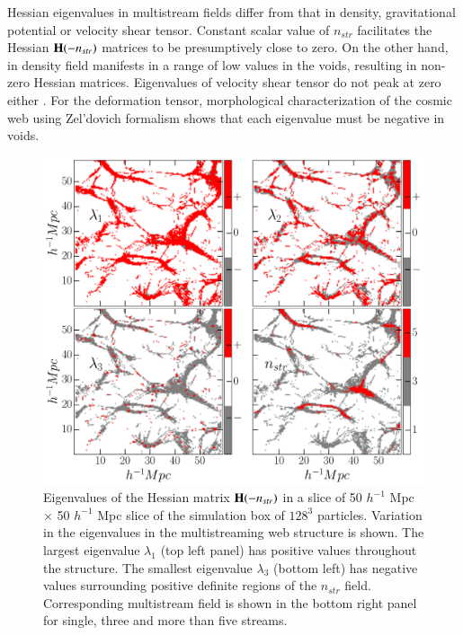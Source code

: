Hessian eigenvalues in multistream fields differ from that in density, gravitational potential or velocity shear tensor. Constant scalar value of $n_{str}$ facilitates the Hessian ${\bf H}(-n_{str})$ matrices to be presumptively close to zero. On the other hand, in density field manifests in a range of low values in the voids, resulting in non-zero Hessian matrices. Eigenvalues of velocity shear tensor do not peak at zero either \cite{Libeskind2013}. For the deformation tensor, morphological characterization of the cosmic web using Zel'dovich formalism shows that each eigenvalue must be negative in voids. 

\begin{figure}
\begin{minipage}[t]{0.99\linewidth}
 \centering\includegraphics[height=14.cm]{Chapter4/Source_v2/fig8.pdf} 
\end{minipage}\hfill
\caption{Eigenvalues of the Hessian matrix ${\bf H}(-n_{str})$ in a slice of 50 $h^{-1}$ Mpc $\times$ 50 $h^{-1}$ Mpc slice of the simulation box of $128^3$ particles. Variation in the eigenvalues in the multistreaming web structure is shown. The largest eigenvalue $\lambda_1$ (top left panel) has positive values throughout the structure. The smallest eigenvalue $\lambda_3$ (bottom left) has negative values surrounding positive definite regions of the $n_{str}$ field. Corresponding multistream field is shown in the bottom right panel for single, three and more than five streams.}
\label{fig:evals123}
\end{figure}

